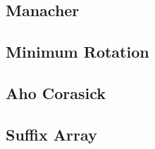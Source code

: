 \documentclass[10pt,a4paper,twocolumn,oneside]{article}
\begin{document}
		\subsection{Manacher}
			
		\subsection{Minimum Rotation}
			
		\subsection{Aho Corasick}
			
		\subsection{Suffix Array}
			
\end{document}
